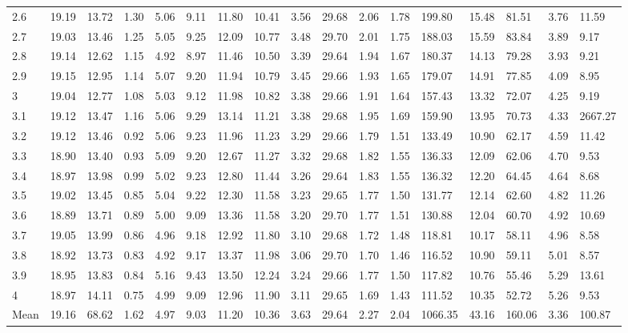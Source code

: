 \begin{adjustbox}{angle=90}
\begin{center}
\begin{tabular}{|l|llllllllllllllll|}
2.6&19.19&13.72&1.30&5.06&9.11&11.80&10.41&3.56&29.68&2.06&1.78&199.80&15.48&81.51&3.76&11.59  \\ 
2.7&19.03&13.46&1.25&5.05&9.25&12.09&10.77&3.48&29.70&2.01&1.75&188.03&15.59&83.84&3.89&9.17  \\ 
2.8&19.14&12.62&1.15&4.92&8.97&11.46&10.50&3.39&29.64&1.94&1.67&180.37&14.13&79.28&3.93&9.21  \\ 
2.9&19.15&12.95&1.14&5.07&9.20&11.94&10.79&3.45&29.66&1.93&1.65&179.07&14.91&77.85&4.09&8.95  \\ 
3&19.04&12.77&1.08&5.03&9.12&11.98&10.82&3.38&29.66&1.91&1.64&157.43&13.32&72.07&4.25&9.19  \\ 
3.1&19.12&13.47&1.16&5.06&9.29&13.14&11.21&3.38&29.68&1.95&1.69&159.90&13.95&70.73&4.33&2667.27  \\ 
3.2&19.12&13.46&0.92&5.06&9.23&11.96&11.23&3.29&29.66&1.79&1.51&133.49&10.90&62.17&4.59&11.42  \\ 
3.3&18.90&13.40&0.93&5.09&9.20&12.67&11.27&3.32&29.68&1.82&1.55&136.33&12.09&62.06&4.70&9.53  \\ 
3.4&18.97&13.98&0.99&5.02&9.23&12.80&11.44&3.26&29.64&1.83&1.55&136.32&12.20&64.45&4.64&8.68  \\ 
3.5&19.02&13.45&0.85&5.04&9.22&12.30&11.58&3.23&29.65&1.77&1.50&131.77&12.14&62.60&4.82&11.26  \\ 
3.6&18.89&13.71&0.89&5.00&9.09&13.36&11.58&3.20&29.70&1.77&1.51&130.88&12.04&60.70&4.92&10.69  \\ 
3.7&19.05&13.99&0.86&4.96&9.18&12.92&11.80&3.10&29.68&1.72&1.48&118.81&10.17&58.11&4.96&8.58  \\ 
3.8&18.92&13.73&0.83&4.92&9.17&13.37&11.98&3.06&29.70&1.70&1.46&116.52&10.90&59.11&5.01&8.57  \\ 
3.9&18.95&13.83&0.84&5.16&9.43&13.50&12.24&3.24&29.66&1.77&1.50&117.82&10.76&55.46&5.29&13.61  \\ 
4&18.97&14.11&0.75&4.99&9.09&12.96&11.90&3.11&29.65&1.69&1.43&111.52&10.35&52.72&5.26&9.53  \\ \hline \hline
Mean&19.16&68.62&1.62&4.97&9.03&11.20&10.36&3.63&29.64&2.27&2.04&1066.35&43.16&160.06&3.36&100.87  \\ \hline
\end{tabular}
\end{center}
\end{adjustbox}





